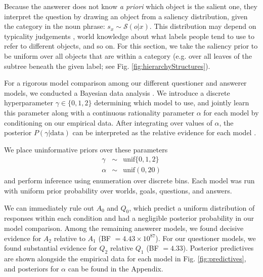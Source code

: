 \documentclass[12pt, floatsintext, jou]{apa6}
\begin{document}
Because the answerer does not know \emph{a priori} which object is the salient one, they interpret the question by drawing an object from a saliency distribution, given the category in the noun phrase: $s_x \sim \mathcal{S}(o | x)$. This distribution may depend on typicality judgements \cite{Rosch75}, world knowledge about what labels people tend to use to refer to different objects, and so on. For this section, we take the saliency prior to be uniform over all objects that are within a category (e.g. over all leaves of the subtree beneath the given label; see Fig. \ref{fig:hierarchyStructures}).  %

For a rigorous model comparison among our different questioner and answerer models, we conducted a Bayesian data analysis \cite{LeeWagenmakers14_BDA}. We introduce a discrete hyperparameter $\gamma \in \{0, 1, 2\}$  determining which model to use, and jointly learn this parameter along with a continuous rationality parameter $\alpha$ for each model by conditioning on our empirical data. After integrating over values of $\alpha$, the posterior $P(\gamma | \textrm{data})$ can be interpreted as the relative evidence for each model \cite{KruschkeVanPaemel15_OxfordHandbook}.

We place uninformative priors over these parameters
$$\begin{array}{rcl}
\gamma & \sim & \textrm{unif}\{0, 1, 2\} \\
\alpha &  \sim & \textrm{unif}(0,20)
\end{array}$$ 
and perform inference using enumeration over discrete bins. Each model was run with uniform prior probability over worlds, goals, questions, and answers.

We can immediately rule out $A_0$ and $Q_0$, which predict a uniform distribution of responses within each condition and had a negligible posterior probability in our model comparison. Among the remaining answerer models, we found decisive evidence for $A_2$ relative to $A_1$ (BF $= 4.43 \times 10^{87}$). For our questioner models, we found substantial evidence for $Q_2$ relative $Q_1$ (BF $=4.33$). Posterior predictives are shown alongside the empirical data for each model in Fig. \ref{fig:predictives}, and posteriors for $\alpha$ can be found in the Appendix. 
\end{document}
